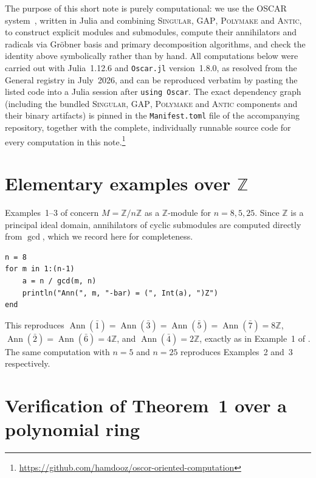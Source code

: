 \documentclass[11pt]{article}
\begin{document}
The purpose of this short note is purely computational: we use the
\textsc{OSCAR} system~\cite{oscar}, written in Julia and combining
\textsc{Singular}, \textsc{GAP}, \textsc{Polymake} and \textsc{Antic}, to
construct explicit modules and submodules, compute their annihilators and
radicals via Gr\"obner basis and primary decomposition algorithms, and
check the identity above symbolically rather than by hand. All
computations below were carried out with Julia~1.12.6 and
\texttt{Oscar.jl} version~1.8.0, as resolved from the General registry
in July~2026, and can be reproduced verbatim by pasting the listed code
into a Julia session after \texttt{using Oscar}. The exact dependency
graph (including the bundled \textsc{Singular}, \textsc{GAP},
\textsc{Polymake} and \textsc{Antic} components and their binary
artifacts) is pinned in the \texttt{Manifest.toml} file of the
accompanying repository, together with the complete, individually
runnable source code for every computation in this note.\footnote{\url{https://github.com/hamdooz/oscor-oriented-computation}}

\section{Elementary examples over $\mathbb{Z}$}

Examples~1--3 of \cite{pekin-ozkaya-2026} concern $M=\mathbb Z/n\mathbb Z$
as a $\mathbb Z$-module for $n=8,5,25$. Since $\mathbb Z$ is a principal
ideal domain, annihilators of cyclic submodules are computed directly
from $\gcd$, which we record here for completeness.

\begin{lstlisting}
n = 8
for m in 1:(n-1)
    a = n / gcd(m, n)
    println("Ann(", m, "-bar) = (", Int(a), ")Z")
end
\end{lstlisting}

This reproduces $\operatorname{Ann}(\bar 1)=\operatorname{Ann}(\bar
3)=\operatorname{Ann}(\bar 5)=\operatorname{Ann}(\bar 7)=8\mathbb Z$,
$\operatorname{Ann}(\bar 2)=\operatorname{Ann}(\bar 6)=4\mathbb Z$, and
$\operatorname{Ann}(\bar 4)=2\mathbb Z$, exactly as in Example~1 of
\cite{pekin-ozkaya-2026}. The same computation with $n=5$ and $n=25$
reproduces Examples~2 and~3 respectively.

\section{Verification of Theorem~1 over a polynomial ring}
\end{document}
